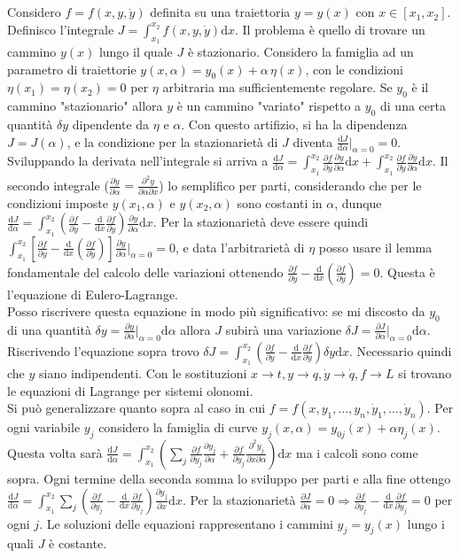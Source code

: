 \documentclass[10pt,a4paper]{article}
\newcommand{\de}{\mathrm d}
\newcommand{\fracd}[2]{\frac{\de #1}{\de #2}}
\newcommand{\fracp}[2]{\frac{\partial #1}{\partial #2}}
\newcommand{\fracpp}[3]{\frac{\partial^2 #1}{\partial #2 \partial #3}}
\begin{document}
	\section{}
Considero $f=f(x,y,\dot y)$ definita su una traiettoria $y=y(x)$ con $x\in[x_1,x_2]$. Definisco l'integrale $J=\int_{x_1}^{x_2}f(x,y,\dot y)\de x$. Il problema è quello di trovare un cammino $y(x)$ lungo il quale $J$ è stazionario. Considero la famiglia ad un parametro di traiettorie $y(x,\alpha)=y_0(x)+\alpha\,\eta(x)$, con le condizioni $\eta(x_1)=\eta(x_2)=0$ per $\eta$ arbitraria ma sufficientemente regolare. Se $y_0$ è il cammino "stazionario" allora $y$ è un cammino "variato" rispetto a $y_0$ di una certa quantità $\delta y$ dipendente da $\eta$ e $\alpha$. Con questo artifizio, si ha la dipendenza $J=J(\alpha)$, e la condizione per la stazionarietà di $J$ diventa $\fracd{J}{\alpha}|_{\alpha=0}=0$. Sviluppando la derivata nell'integrale si arriva a $\fracd{J}{\alpha}=\int_{x_1}^{x_2}\fracp{f}{y}\fracp{y}{\alpha}\de x + \int_{x_1}^{x_2}\fracp{f}{\dot y}\fracp{\dot y}{\alpha}\de x$. Il secondo integrale ($\fracp{\dot y}{\alpha} = \fracpp{y}{\alpha}{x}$) lo semplifico per parti, considerando che per le condizioni imposte $y(x_1,\alpha)$ e $y(x_2,\alpha)$ sono costanti in $\alpha$, dunque $\fracd{J}{\alpha}=\int_{x_1}^{x_2}(\fracp{f}{y}-\fracd{}{x}\fracp{f}{\dot y}) {\fracp{y}{\alpha}}\de x$. Per la stazionarietà deve essere quindi $\int_{x_1}^{x_2}[\fracp{f}{y}-\fracd{}{x}(\fracp{f}{\dot y})]{\fracp{y}{\alpha}}|_{\alpha=0} = 0$, e data l'arbitrarietà di $\eta$ posso usare il lemma fondamentale del calcolo delle variazioni ottenendo $\fracp{f}{y}-\fracd{}{x}(\fracp{f}{\dot y})=0$. Questa è l'equazione di Eulero-Lagrange.\\
Posso riscrivere questa equazione in modo più significativo: se mi discosto da $y_0$ di una quantità $\delta y=\fracp{y}{\alpha}|_{\alpha=0}\de\alpha$ allora $J$ subirà una variazione $\delta J=\fracp{J}{\alpha}|_{\alpha=0}\de\alpha$. Riscrivendo l'equazione sopra trovo $\delta J=\int_{x_1}^{x_2}(\fracp{f}{y}-\fracd{}{x}\fracp{f}{\dot y})\delta y\de x$. Necessario quindi che $y$ siano indipendenti. Con le sostituzioni $x \to t, y \to q, \dot y \to \dot q, f \to L$ si trovano le equazioni di Lagrange per sistemi olonomi.\\
Si può generalizzare quanto sopra al caso in cui $f = f(x, y_1, \ldots, y_n, \dot y_1,\ldots,\dot y_n)$. Per ogni variabile $y_j$ considero la famiglia di curve $y_j(x,\alpha) = y_{0j}(x) + \alpha\eta_j(x)$. Questa volta sarà $\fracd {J}{\alpha} = \int_{x_1}^{x_2} (\sum_j \fracp{f}{y_j} \fracp{y_j}{\alpha} + \fracp{f}{\dot y_j} \fracpp{y_j}{x}{\alpha}) \de x$ ma i calcoli sono come sopra. Ogni termine della seconda somma lo sviluppo per parti e alla fine ottengo $\fracd {J}{\alpha} = \int_{x_1}^{x_2} \sum_j (\fracp{f}{y_j} - \fracd{}{x} \fracp{f}{\dot y_j}) \fracp{y_j}{x}\de x$. Per la stazionarietà $\fracp{J}{\alpha} = 0 \Rightarrow \fracp{f}{y_j} - \fracd{}{x} \fracp{f}{\dot y_j} = 0$ per ogni $j$. Le soluzioni delle equazioni rappresentano i cammini $y_j = y_j(x)$ lungo i quali $J$ è costante.
	
\end{document}
